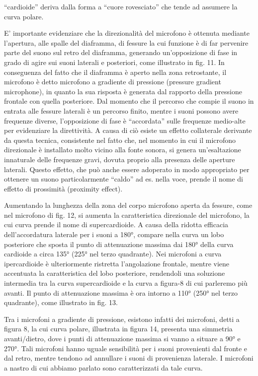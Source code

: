 “cardioide” deriva dalla forma a “cuore rovesciato” che tende ad assumere la curva polare.

E’ importante evidenziare che la direzionalità del microfono è ottenuta mediante l’apertura, alle spalle del diaframma, di fessure la cui funzione è di far pervenire parte del suono sul retro del diaframma, generando un’opposizione di fase in grado di agire sui suoni laterali e posteriori, come illustrato in fig. 11.
In conseguenza del fatto che il diaframma è aperto nella zona retrostante, il microfono è detto microfono a gradiente di pressione (pressure gradient microphone), in quanto la sua risposta è generata dal rapporto della pressione frontale con quella posteriore.
Dal momento che il percorso che compie il suono in entrata alle fessure laterali è un percorso finito, mentre i suoni possono avere frequenze diverse, l’opposizione di fase è “accordata” sulle frequenze medio-alte per evidenziare la direttività. A causa di ciò esiste un effetto collaterale derivante da questa tecnica, consistente nel fatto che, nel momento in cui il microfono direzionale è installato molto vicino alla fonte sonora, si genera un’esaltazione innaturale delle frequenze gravi, dovuta proprio alla presenza delle aperture laterali. Questo effetto, che può anche essere adoperato in modo appropriato per ottenere un suono particolarmente “caldo” ad es. nella voce, prende il nome di effetto di prossimità (proximity effect).

Aumentando la lunghezza della zona del corpo microfono aperta da fessure, come nel microfono di fig. 12, si aumenta la caratteristica direzionale del microfono, la cui curva prende il nome di supercardioide. A causa della ridotta efficacia dell’accordatura laterale per i suoni a 180°, compare nella curva un lobo posteriore che sposta il punto di attenuazione massima dai 180° della curva cardioide a circa 135° (225° nel terzo quadrante). Nei microfoni a curva ipercardioide è ulteriormente ristretta l’angolazione frontale, mentre viene accentuata la caratteristica del lobo posteriore, rendendoli una soluzione intermedia tra la curva supercardioide e la curva a figura-8 di cui parleremo più avanti. Il punto di attenuazione massima è ora intorno a 110° (250° nel terzo quadrante), come illustrato in fig. 13.

Tra i microfoni a gradiente di pressione, esistono infatti dei microfoni, detti a figura 8, la cui curva polare, illustrata in figura 14, presenta una simmetria avanti/dietro, dove i punti di attenuazione massima si vanno a situare a 90° e 270°. Tali microfoni hanno uguale sensibilità per i suoni provenienti dal fronte e dal retro, mentre tendono ad annullare i suoni di provenienza laterale. I microfoni a nastro di cui abbiamo parlato sono caratterizzati da tale curva.

